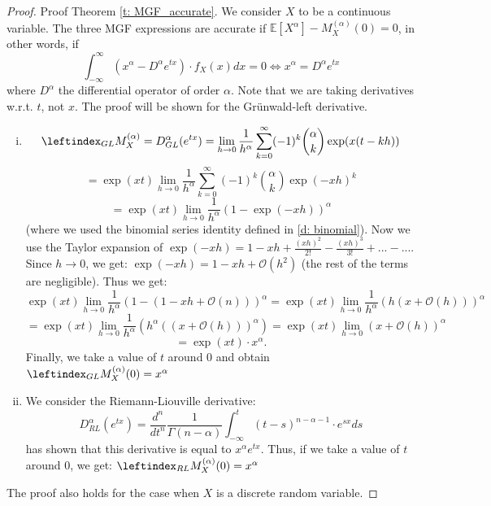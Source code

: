\begin{proof}
    Proof Theorem \ref{t: MGF_accurate}.
    We consider \(X\) to be a continuous variable. The three MGF expressions are accurate if \(\mathbb{E}[X^\alpha] - M_X^{(\alpha)}(0) = 0\), in other words, if 
    \[\int_{-\infty}^{\infty} (x^\alpha - D^\alpha e^{tx}) \cdot f_X(x) dx = 0 \iff x^\alpha = D^\alpha e^{tx}\]
    where \(D^\alpha\) the differential operator of order \(\alpha\). Note that we are taking derivatives w.r.t. \(t\), not \(x\). The proof will be shown for the Grünwald-left derivative.
    \begin{enumerate}[(i)]
        \item \[\leftindex_{GL}{M}_X^{(\alpha)} = D^\alpha_{GL}(e^{tx})  = \lim_{h \to 0} \frac{1}{h^\alpha} \sum_{k=0}^\infty (-1)^k \binom{\alpha}{k} \exp(x(t - kh))\]
        \[= \exp(xt) \lim_{h \to 0} \frac{1}{h^\alpha} \sum_{k=0}^\infty (-1)^k \binom{\alpha}{k} \exp(-xh)^k\]
        \[= \exp(xt) \lim_{h \to 0} \frac{1}{h^\alpha} (1 - \exp(-xh))^\alpha\]
        (where we used the binomial series identity defined in \ref{d: binomial}). Now we use the Taylor expansion of \(\exp(-xh) = 1 - xh + \frac{(xh)^2}{2!} - \frac{(xh)^3}{3!} + ... - ...\). Since \(h \to 0\), we get: \(\exp(-xh) = 1 - xh + \mathcal{O}(h^2)\) (the rest of the terms are negligible).
        Thus we get:
        \[ \exp(xt) \lim_{h \to 0} \frac{1}{h^\alpha} \left(1 -(1 - xh + \mathcal{O}(n))\right)^\alpha = \exp(xt) \lim_{h \to 0} \frac{1}{h^\alpha} \left(h(x + \mathcal{O}(h))\right)^\alpha \]
        \[ = \exp(xt) \lim_{h \to 0} \frac{1}{h^\alpha} \left(h^\alpha((x + \mathcal{O}(h)))^\alpha\right) = \exp(xt) \lim_{h \to 0} (x + \mathcal{O}(h))^\alpha\]
        \[ = \exp(xt) \cdot x^\alpha.\]
        Finally, we take a value of \(t\) around 0 and obtain \(\leftindex_{GL}{M}_X^{(\alpha)}(0) = x^\alpha\) 
        \item We consider the Riemann-Liouville derivative: 
        \[D_{RL}^\alpha(e^{tx}) = \frac{d^n}{dt^n} \frac{1}{\Gamma(n -\alpha)}  \int_{-\infty}^{t} (t-s)^{n - \alpha-1} \cdot e^{sx} ds\]
        \citet{koning15} has shown that this derivative is equal to \(x^\alpha e^{tx}\). Thus, if we take a value of \(t\) around 0, we get: \(\leftindex_{RL}{M}_X^{(\alpha)}(0) = x^\alpha\)
    \end{enumerate}

    The proof also holds for the case when \(X\) is a discrete random variable.
\end{proof}

